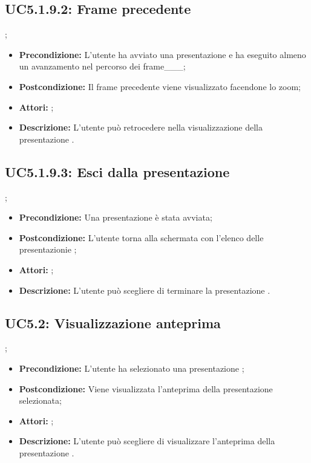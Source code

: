 \subsection{ UC5.1.9.2: Frame precedente}
;
\begin{itemize}
	\item \textbf{Precondizione:} L'utente ha avviato una presentazione e ha eseguito almeno un avanzamento nel percorso dei frame___;
	\item \textbf{Postcondizione:} Il frame precedente viene visualizzato facendone lo zoom;
	\item \textbf{Attori:} ;
	\item \textbf{Descrizione:} L'utente può retrocedere nella visualizzazione della presentazione .
\end{itemize}
\subsection{ UC5.1.9.3: Esci dalla presentazione }
;
\begin{itemize}
	\item \textbf{Precondizione:} Una presentazione è stata avviata;
	\item \textbf{Postcondizione:} L'utente torna alla schermata con l'elenco delle presentazionie ;
	\item \textbf{Attori:} ;
	\item \textbf{Descrizione:} L'utente può scegliere di terminare la presentazione .
\end{itemize}
\subsection{ UC5.2: Visualizzazione anteprima }
;
\begin{itemize}
	\item \textbf{Precondizione:} L'utente ha selezionato una presentazione ;
	\item \textbf{Postcondizione:} Viene visualizzata l'anteprima della presentazione selezionata;
	\item \textbf{Attori:} ;
	\item \textbf{Descrizione:} L'utente può scegliere di visualizzare l'anteprima della presentazione .
\end{itemize}
